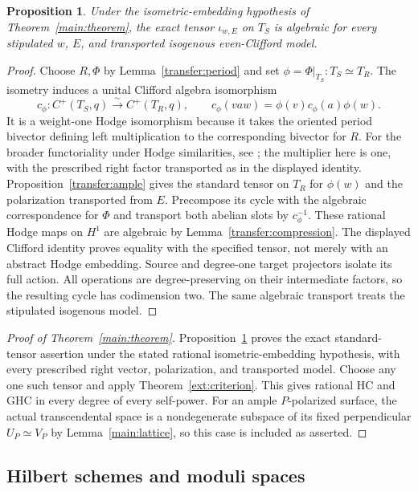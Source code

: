 \documentclass[11pt]{amsart}
\newtheorem{proposition}[theorem]{Proposition}
\theoremstyle{definition}
\theoremstyle{remark}
\numberwithin{equation}{section}
\begin{document}
\begin{proposition}\label{transfer:tensor}
Under the isometric-embedding hypothesis of Theorem~\ref{main:theorem},
the exact tensor $\iota_{w,E}$ on $T_S$ is algebraic for every stipulated
$w$, $E$, and transported isogenous even-Clifford model.
\end{proposition}
\begin{proof}
Choose $R,\Phi$ by Lemma~\ref{transfer:period} and set
$\phi=\Phi|_{T_S}:T_S\simeq T_R$.  The isometry induces a unital
Clifford algebra isomorphism
\[
 c_\phi:C^+(T_S,q)\xrightarrow{\sim}C^+(T_R,q),
 \qquad c_\phi(vaw)=\phi(v)c_\phi(a)\phi(w).
\]
It is a weight-one Hodge isomorphism because it takes the oriented
period bivector defining left multiplication to the corresponding
bivector for $R$.  For the broader functoriality under Hodge similarities,
see \cite[Proposition~3.1 and Lemma~3.5]{VarescoSimilarities}; the
multiplier here is one, with the prescribed right factor transported
as in the displayed identity.
Proposition~\ref{transfer:ample} gives the standard
tensor on $T_R$ for $\phi(w)$ and the polarization transported from $E$.
Precompose its cycle with the algebraic correspondence for $\Phi$ and
transport both abelian slots by $c_\phi^{-1}$.  These rational Hodge
maps on $H^1$ are algebraic by Lemma~\ref{transfer:compression}.
The displayed Clifford identity proves equality with the specified
tensor, not merely with an abstract Hodge embedding.  Source and
degree-one target projectors isolate its full action.  All operations
are degree-preserving on their intermediate factors, so the resulting
cycle has codimension two.  The same algebraic transport treats the
stipulated isogenous model.
\end{proof}

\begin{proof}[Proof of Theorem~\ref{main:theorem}]
Proposition~\ref{transfer:tensor} proves the exact standard-tensor
assertion under the stated rational isometric-embedding hypothesis,
with every prescribed right vector, polarization, and transported model.
Choose any one such tensor and apply Theorem~\ref{ext:criterion}.
This gives rational HC and GHC in every degree of every self-power.
For an ample $P$-polarized surface, the actual transcendental space
is a nondegenerate subspace of its fixed perpendicular $U_P\simeq V_P$
by Lemma~\ref{main:lattice}, so this case is included as asserted.
\end{proof}

\subsection{Hilbert schemes and moduli spaces}
\end{document}
